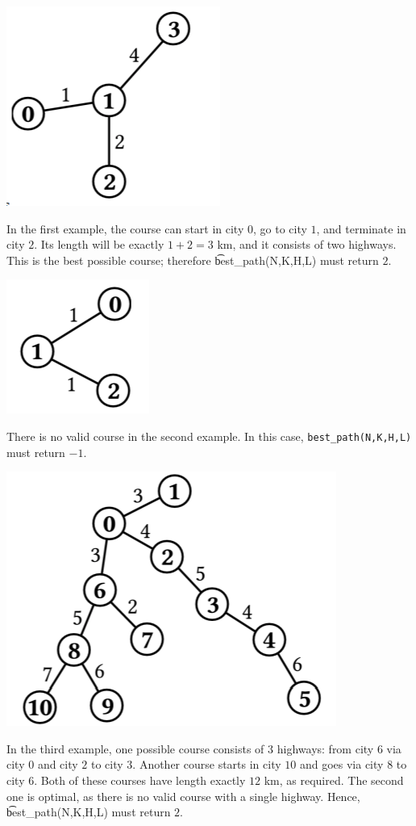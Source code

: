 \includegraphics{race1.png}

In the first example, the course can start in city $0$, go to city $1$, and terminate in city $2$. Its length will be exactly $1 + 2 = 3$ km, and it consists of two highways. This is the best possible course; therefore \t{best\_path(N,K,H,L)} must return $2$.

\includegraphics{race2.png}

There is no valid course in the second example. In this case, \texttt{best\_path(N,K,H,L)} must return $-1$.

\includegraphics{race3.png}

In the third example, one possible course consists of $3$ highways: from
city $6$ via city $0$ and city $2$ to city $3$. Another course starts in city $10$ and goes via city $8$ to city $6$. Both of these courses have length exactly $12$ km, as required. The second one is optimal, as there is no valid course with a single highway. Hence,
\t{best\_path(N,K,H,L)} must return $2$.